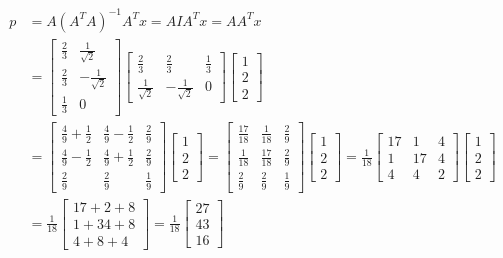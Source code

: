 \documentclass{article}
\begin{document}
\begin{align*}
    p &= A (A^T A)^{-1} A^T x = A I A^T x = A A^T x \\
    &= \begin{bmatrix} \frac{2}{3} & \frac{1}{\sqrt{2}} \\ \frac{2}{3} & -\frac{1}{\sqrt{2}} \\ \frac{1}{3} & 0 \end{bmatrix}
        \begin{bmatrix} \frac{2}{3} & \frac{2}{3} & \frac{1}{3} \\ \frac{1}{\sqrt{2}} & -\frac{1}{\sqrt{2}} & 0 \end{bmatrix}
        \begin{bmatrix} 1 \\ 2 \\ 2 \end{bmatrix} \\
    &= \begin{bmatrix} \frac{4}{9} + \frac{1}{2} & \frac{4}{9} - \frac{1}{2} & \frac{2}{9} \\
        \frac{4}{9} - \frac{1}{2} & \frac{4}{9} + \frac{1}{2} & \frac{2}{9} \\
        \frac{2}{9} & \frac{2}{9} & \frac{1}{9} \end{bmatrix}
        \begin{bmatrix} 1 \\ 2 \\ 2 \end{bmatrix}
    =   \begin{bmatrix} \frac{17}{18} & \frac{1}{18} & \frac{2}{9} \\
        \frac{1}{18} & \frac{17}{18} & \frac{2}{9} \\
        \frac{2}{9} & \frac{2}{9} & \frac{1}{9} \end{bmatrix}
    \begin{bmatrix} 1 \\ 2 \\ 2 \end{bmatrix}
    = \frac{1}{18} \begin{bmatrix} 17 & 1 & 4 \\ 1 & 17 & 4 \\ 4 & 4 & 2 \end{bmatrix}
        \begin{bmatrix} 1 \\ 2 \\ 2 \end{bmatrix} \\
    &= \frac{1}{18} \begin{bmatrix} 17 + 2 + 8 \\ 1 + 34 + 8 \\ 4 + 8 + 4 \end{bmatrix}
    = \frac{1}{18} \begin{bmatrix} 27 \\ 43 \\ 16 \end{bmatrix}
\end{align*}
\end{document}
